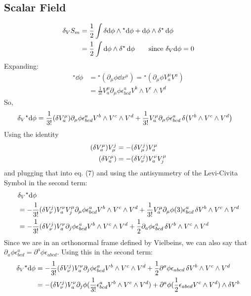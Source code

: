 \documentclass[12pt]{article}
\newcommand{\hodge}{{^\star}}
\begin{document}
\subsection{Scalar Field}
\begin{align}
  \var_V{S_m} &= \frac{1}{2} \int \var\dd\phi \wedge \hodge\dd\phi + \dd\phi \wedge \var\hodge\dd\phi \nonumber \\
  &=  \frac{1}{2} \int \dd\phi \wedge \var\hodge\dd\phi \qquad \text{since } \var_V\dd\phi = 0 
\end{align}
Expanding:
\begin{align*}
  \hodge\dd\phi &= \hodge(\partial_\mu\phi \dd x^\mu) = \hodge(\partial_\mu\phi V^\mu_a V^a)\\ 
  &= \frac{1}{3!} V^\mu_a \partial_\mu\phi \epsilon^a_{bcd}V^b \wedge V^c \wedge V^d
\end{align*}
So,
\begin{align}
  \var_V\hodge\dd\phi &= \frac{1}{3!}(\var V^\mu_a)\partial_\mu\phi \epsilon^a_{bcd} V^b \wedge V^c \wedge V^d + \frac{1}{3!} V^\mu_a \partial_\mu\phi \epsilon^a_{bcd}\var(V^b \wedge V^c \wedge V^d)
\end{align}
Using the identity
\begin{align*}
  (\var V^\mu_a)V^j_\mu &= -(\var V^j_\mu)V^\mu_a \\
  (\var V^\mu_a) &= -(\var V^j_\nu)V^\nu_a V_j^\mu
\end{align*}
and plugging that into eq. (7) and using the antisymmetry of the Levi-Civita Symbol in the second term:
\begin{align*}
  &\var_V\hodge\dd\phi \\ &= -\frac{1}{3!}(\var V^j_\nu)V^\nu_a V_j^\mu \partial_\mu\phi \epsilon^a_{bcd}V^b \wedge V^c \wedge V^d + \frac{1}{3!} V^\mu_a \partial_\mu\phi (3)\epsilon^a_{bcd}\var{V^b} \wedge V^c \wedge V^d \\
  &= -\frac{1}{3!}(\var V^j_\nu)V^\nu_a \partial_j\phi \epsilon^a_{bcd}V^b \wedge V^c \wedge V^d + \frac{1}{2} \partial_a\phi \epsilon^a_{bcd}\var{V^b} \wedge V^c \wedge V^d
\end{align*}
Since we are in an orthonormal frame defined by Vielbeins, we can also say that $\partial_a\phi \epsilon^a_{bcd} = \partial^a\phi \epsilon_{abcd}$. Using this in the second term:
\begin{align*}
  \var_V\hodge\dd\phi &= -\frac{1}{3!}(\var V^j_\nu)V^\nu_a \partial_j\phi \epsilon^a_{bcd}V^b \wedge V^c \wedge V^d + \frac{1}{2} \partial^a\phi \epsilon_{abcd}\var{V^b} \wedge V^c \wedge V^d \\
  &= -(\var V^j_\nu)V^\nu_a \partial_j\phi (\frac{1}{3!} \epsilon^a_{bcd}V^b \wedge V^c \wedge V^d) + \partial^a\phi (\frac{1}{2} \epsilon_{abcd} V^c \wedge V^d) \wedge \var{V^b}
\end{align*}
\end{document}
